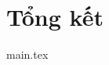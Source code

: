 \documentclass[12pt, a4paper]{report}
\theoremstyle{definition}
\begin{document}
\chapter{Tổng kết}
\label{chap:summary}
\thispagestyle{fancy}
{main.tex}







\newpage
\end{document}
